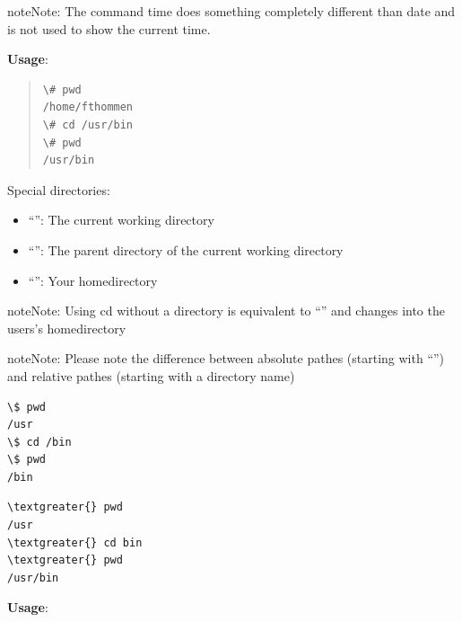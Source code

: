 \documentclass[letterpaper,10pt,english]{sphinxmanual}
\begin{document}
\begin{notice}{note}{Note:}
The command time does something completely different than date and is not used to show the current time.
\end{notice}

\textbf{Usage}: 
\begin{quote}

\begin{Verbatim}[commandchars=\\\{\}]
\# pwd
/home/fthommen
\# cd /usr/bin
\# pwd
/usr/bin
\end{Verbatim}
\end{quote}

Special directories:
\begin{itemize}
\item {} 
“”:  The current working directory

\item {} 
“”: The parent directory of the current working directory

\item {} 
“\code{\textasciitilde{}}”:  Your homedirectory

\end{itemize}

\begin{notice}{note}{Note:}
Using cd without a directory is equivalent to “” and changes into the users’s homedirectory
\end{notice}

\begin{notice}{note}{Note:}
Please note the difference between absolute pathes (starting with ``\code{/}'') and relative pathes (starting with a directory name)
\end{notice}

\begin{Verbatim}[commandchars=\\\{\}]
\$ pwd
/usr
\$ cd /bin
\$ pwd
/bin
\end{Verbatim}

\begin{Verbatim}[commandchars=\\\{\}]
\textgreater{} pwd
/usr
\textgreater{} cd bin
\textgreater{} pwd
/usr/bin
\end{Verbatim}
\begin{description}
\item[{\textbf{Usage}:}] \leavevmode
{}

\end{description}
\end{document}
